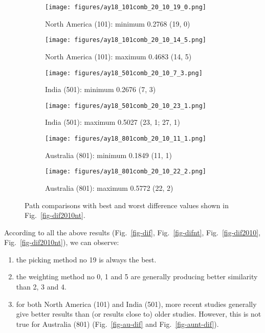 \begin{figure*}
	\centering
	\begin{subfigure}{.43\textwidth}
		\texttt{[image: figures/ay18\_101comb\_20\_10\_19\_0.png]}
		\caption{North America (101): minimum 0.2768 (19, 0)}\label{fig-nant-2010190}
	\end{subfigure}
	\begin{subfigure}{.43\textwidth}
		\texttt{[image: figures/ay18\_101comb\_20\_10\_14\_5.png]}
		\caption{North America (101): maximum 0.4683 (14, 5)}\label{fig-nant-2010145}
	\end{subfigure}
	\vspace{.1em}
	\begin{subfigure}{.43\textwidth}
		\texttt{[image: figures/ay18\_501comb\_20\_10\_7\_3.png]}
		\caption{India (501): minimum 0.2676 (7, 3)}\label{fig-indnt-201073}
	\end{subfigure}
	\begin{subfigure}{.43\textwidth}
		\texttt{[image: figures/ay18\_501comb\_20\_10\_23\_1.png]}
		\caption{India (501): maximum 0.5027 (23, 1; 27, 1)}\label{fig-indnt-2010231}
	\end{subfigure}
	\vspace{.1em}
	\begin{subfigure}{.43\textwidth}
		\texttt{[image: figures/ay18\_801comb\_20\_10\_11\_1.png]}
		\caption{Australia (801): minimum 0.1849 (11, 1)}\label{fig-aunt-2010111}
	\end{subfigure}
	\begin{subfigure}{.43\textwidth}
		\texttt{[image: figures/ay18\_801comb\_20\_10\_22\_2.png]}
		\caption{Australia (801): maximum 0.5772 (22, 2)}\label{fig-aunt-2010222}
	\end{subfigure}
	\caption[Best and worst differences without shape test (20 Myr bin, 10 Myr
step)]{Path comparisons with best and worst difference values shown in
Fig.~\ref{fig-dif2010nt}.}\label{fig-dif2010ntbw}
\end{figure*}

According to all the above results (Fig.~\ref{fig-dif}, Fig.~\ref{fig-difnt},
Fig.~\ref{fig-dif2010}, Fig.~\ref{fig-dif2010nt}), we can observe:

\begin{enumerate}
  \item the picking method no 19 is always the best.
  \item the weighting method no 0, 1 and 5 are generally producing better
        similarity than 2, 3 and 4.
  \item for both North America (101) and India (501), more recent studies
        generally give better results than (or results close to) older studies.
		However, this is not true for Australia (801) (Fig.~\ref{fig-au-dif} and
		Fig.~\ref{fig-aunt-dif}).
\end{enumerate}

